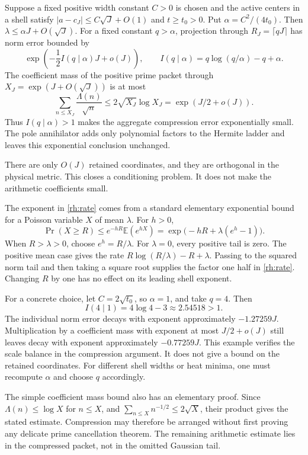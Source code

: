 Suppose a fixed positive width constant \(C>0\) is chosen and the active centers in a shell satisfy
\(|a-c_J|\le C\sqrt J+O(1)\) and \(t\ge t_0>0\). Put
\(\alpha=C^2/(4t_0)\). Then \(\lambda\le\alpha J+O(\sqrt J)\). For a fixed constant \(q>\alpha\), projection through \(R_J=\lceil qJ\rceil\) has norm error bounded by
\begin{equation}\label{rh:rate}
\exp\left(-\frac12 I(q\mid\alpha)J+o(J)\right),
\qquad I(q\mid\alpha)=q\log(q/\alpha)-q+\alpha.
\end{equation}
The coefficient mass of the positive prime packet through
\(X_J=\exp(J+O(\sqrt J))\) is at most
\[
\sum_{n\le X_J}\frac{\Lambda(n)}{\sqrt n}
\le2\sqrt{X_J}\log X_J=\exp(J/2+o(J)).
\]
Thus \(I(q\mid\alpha)>1\) makes the aggregate compression error exponentially small. The pole annihilator adds only polynomial factors to the Hermite ladder and leaves this exponential conclusion unchanged.

There are only \(O(J)\) retained coordinates, and they are orthogonal in the physical metric. This closes a conditioning problem. It does not make the arithmetic coefficients small.

The exponent in \eqref{rh:rate} comes from a standard elementary exponential bound for a Poisson variable \(X\) of mean \(\lambda\). For \(h>0\),
\[
\Pr(X\ge R)\le e^{-hR}\mathbb E(e^{hX})
=\exp\bigl(-hR+\lambda(e^h-1)\bigr).
\]
When \(R>\lambda>0\), choose \(e^h=R/\lambda\). For \(\lambda=0\), every positive tail is zero. The positive mean case gives the rate
\(R\log(R/\lambda)-R+\lambda\). Passing to the squared norm tail and then taking a square root supplies the factor one half in \eqref{rh:rate}. Changing \(R\) by one has no effect on its leading shell exponent.

For a concrete choice, let \(C=2\sqrt{t_0}\), so \(\alpha=1\), and take \(q=4\). Then
\[
I(4\mid1)=4\log4-3\approx2.54518>1.
\]
The individual norm error decays with exponent approximately \(-1.27259J\). Multiplication by a coefficient mass with exponent at most \(J/2+o(J)\) still leaves decay with exponent approximately \(-0.77259J\). This example verifies the scale balance in the compression argument. It does not give a bound on the retained coordinates. For different shell widths or heat minima, one must recompute \(\alpha\) and choose \(q\) accordingly.

The simple coefficient mass bound also has an elementary proof. Since \(\Lambda(n)\le\log X\) for \(n\le X\), and \(\sum_{n\le X}n^{-1/2}\le2\sqrt X\), their product gives the stated estimate. Compression may therefore be arranged without first proving any delicate prime cancellation theorem. The remaining arithmetic estimate lies in the compressed packet, not in the omitted Gaussian tail.

